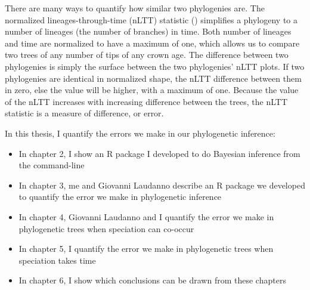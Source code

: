There are many ways to quantify how similar two phylogenies are. 
The normalized lineages-through-time (nLTT) statistic (\cite{janzen2015approximate}) simplifies
a phylogeny to a number of lineages (the number of branches) in time.
Both number of lineages and time are normalized to have a maximum of one,
which allows us to compare two trees of any number of tips of any crown age.
The difference between two phylogenies is simply the surface between the
two phylogenies' nLTT plots. If two phylogenies are identical in 
normalized shape, the nLTT difference between them in zero, else the
value will be higher, with a maximum of one. Because the value of the 
nLTT increases with increasing difference between the trees, the nLTT statistic
is a measure of difference, or error. 

In this thesis, I quantify the errors we make in our phylogenetic inference:

\begin{itemize}
	\item In chapter 2, I show an R package I developed to do Bayesian
    inference from the command-line
	\item In chapter 3, me and Giovanni Laudanno describe an R package we 
    developed to quantify the error we make in phylogenetic inference
	\item In chapter 4, Giovanni Laudanno and I quantify the error we make 
    in phylogenetic trees when speciation can co-occur
	\item In chapter 5, I quantify the error we make 
    in phylogenetic trees when speciation takes time
	\item In chapter 6, I show which conclusions can be drawn from these chapters
\end{itemize}


